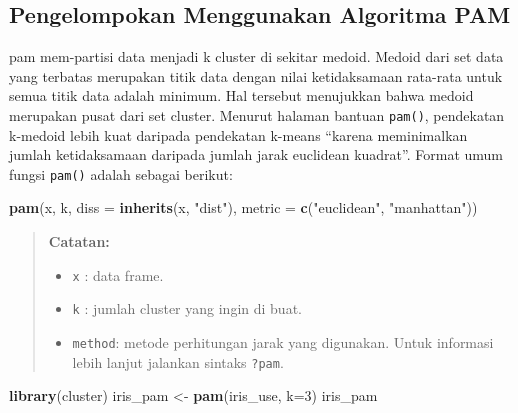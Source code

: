 \documentclass[
]{book}
\newenvironment{Shaded}{\begin{snugshade}}{\end{snugshade}}
\newcommand{\AttributeTok}[1]{\textcolor[rgb]{0.13,0.29,0.53}{#1}}
\newcommand{\DecValTok}[1]{\textcolor[rgb]{0.00,0.00,0.81}{#1}}
\newcommand{\FunctionTok}[1]{\textcolor[rgb]{0.13,0.29,0.53}{\textbf{#1}}}
\newcommand{\NormalTok}[1]{#1}
\newcommand{\OtherTok}[1]{\textcolor[rgb]{0.56,0.35,0.01}{#1}}
\newcommand{\StringTok}[1]{\textcolor[rgb]{0.31,0.60,0.02}{#1}}
\providecommand{\tightlist}{%
  \setlength{\itemsep}{0pt}\setlength{\parskip}{0pt}}
\theoremstyle{definition}
\theoremstyle{definition}
\theoremstyle{definition}
\theoremstyle{definition}
\theoremstyle{remark}
\begin{document}
\hypertarget{pengelompokan-menggunakan-algoritma-pam}{%
\subsection{Pengelompokan Menggunakan Algoritma PAM}\label{pengelompokan-menggunakan-algoritma-pam}}

pam mem-partisi data menjadi k cluster di sekitar medoid. Medoid dari set data yang terbatas merupakan titik data dengan nilai ketidaksamaan rata-rata untuk semua titik data adalah minimum. Hal tersebut menujukkan bahwa medoid merupakan pusat dari set cluster. Menurut halaman bantuan \texttt{pam()}, pendekatan k-medoid lebih kuat daripada pendekatan k-means ``karena meminimalkan jumlah ketidaksamaan daripada jumlah jarak euclidean kuadrat''. Format umum fungsi \texttt{pam()} adalah sebagai berikut:

\begin{Shaded}
\begin{Highlighting}[]
\FunctionTok{pam}\NormalTok{(x, k, }\AttributeTok{diss =} \FunctionTok{inherits}\NormalTok{(x, }\StringTok{"dist"}\NormalTok{),}
    \AttributeTok{metric =} \FunctionTok{c}\NormalTok{(}\StringTok{"euclidean"}\NormalTok{, }\StringTok{"manhattan"}\NormalTok{))}
\end{Highlighting}
\end{Shaded}

\begin{quote}
\textbf{Catatan:}

\begin{itemize}
\tightlist
\item
  \texttt{x} : data frame.
\item
  \texttt{k} : jumlah cluster yang ingin di buat.
\item
  \texttt{method}: metode perhitungan jarak yang digunakan. Untuk informasi lebih lanjut jalankan sintaks \texttt{?pam}.
\end{itemize}
\end{quote}

\begin{Shaded}
\begin{Highlighting}[]
\FunctionTok{library}\NormalTok{(cluster)}
\NormalTok{iris\_pam }\OtherTok{\textless{}{-}} \FunctionTok{pam}\NormalTok{(iris\_use, }\AttributeTok{k=}\DecValTok{3}\NormalTok{)}
\NormalTok{iris\_pam}
\end{Highlighting}
\end{Shaded}
\end{document}
